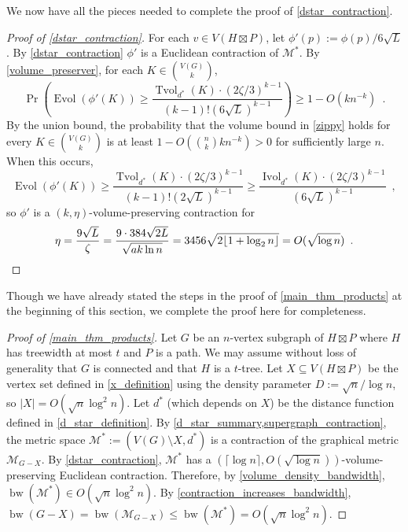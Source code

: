 \documentclass{patmorin}
\renewcommand{\ge}{\geqslant}
\renewcommand{\le}{\leqslant}
\DeclareMathOperator{\bw}{bw}
\DeclareMathOperator{\evol}{Evol}
\DeclareMathOperator{\ivol}{Ivol}
\DeclareMathOperator{\tvol}{Tvol}
\begin{document}
We now have all the pieces needed to complete the proof of \cref{dstar_contraction}.

\begin{proof}[Proof of \cref{dstar_contraction}]
  For each $v\in V(H\boxtimes P)$, let $\phi'(p):=\phi(p)/6\sqrt{L}$. By \cref{dstar_contraction} $\phi'$ is a Euclidean contraction of $\mathcal{M}^*$.  By \cref{volume_preserver}, for each $K\in \binom{V(G)}{k}$,
  \begin{equation}
    \Pr\left(\evol(\phi'(K)) \ge \frac{\tvol_{d^*}(K)\cdot(2\zeta/3)^{k-1}}{(k-1)!(6\sqrt{L})^{k-1}}\right) \ge 1- O(kn^{-k}) \enspace .
    \label{zippy}
  \end{equation}
  By the union bound, the probability that the volume bound in \cref{zippy} holds for every $K\in\binom{V(G)}{k}$ is at least $1-O(\binom{n}{k}kn^{-k}) > 0$ for sufficiently large $n$.  When this occurs,
  \[
    \evol(\phi'(K)) \ge \frac{\tvol_{d^*}(K)\cdot(2\zeta/3)^{k-1}}{(k-1)!(2\sqrt{L})^{k-1}} \ge
    \frac{\ivol_{d^*}(K)\cdot(2\zeta/3)^{k-1}}{(6\sqrt{L})^{k-1}} \enspace ,
  \]
  so $\phi'$ is a $(k,\eta)$-volume-preserving contraction for
  \[
    \eta = \frac{9\sqrt{L}}{\zeta} = \frac{9\cdot 384\sqrt{2L}}{\sqrt{ak\ln n}} = {3456\sqrt{2{\lfloor 1+\log_2 n \rfloor}}} = O(\sqrt{\log n}) \enspace . \qedhere
  \]
\end{proof}

Though we have already stated the steps in the proof of \cref{main_thm_products} at the beginning of this section, we complete the proof here for completeness.

\begin{proof}[Proof of \cref{main_thm_products}]
  Let $G$ be an $n$-vertex subgraph of $H\boxtimes P$ where $H$ has treewidth at most $t$ and $P$ is a path.  We may assume without loss of generality that $G$ is connected and that $H$ is a $t$-tree.  Let $X\subseteq V(H\boxtimes P)$ be the vertex set defined in \cref{x_definition} using the density parameter $D:=\sqrt{n}/\log n$, so $|X|=O(\sqrt{n}\log^2 n)$.  Let $d^*$ (which depends on $X$) be the distance function defined in \cref{d_star_definition}.  By \cref{d_star_summary,supergraph_contraction}, the metric space $\mathcal{M}^*:=(V(G)\setminus X,d^*)$ is a contraction of the graphical metric $\mathcal{M}_{G-X}$.  By \cref{dstar_contraction}, $\mathcal{M}^*$ has a $(\lceil\log n\rceil,O(\sqrt{\log n}))$-volume-preserving Euclidean contraction.  Therefore, by \cref{volume_density_bandwidth}, $\bw(\mathcal{M}^*)\in O(\sqrt{n}\log^2 n)$.  By \cref{contraction_increases_bandwidth}, $\bw(G-X) =\bw(\mathcal{M}_{G-X})\le \bw(\mathcal{M}^*) = O(\sqrt{n}\log^2 n)$.
\end{proof}
\end{document}
